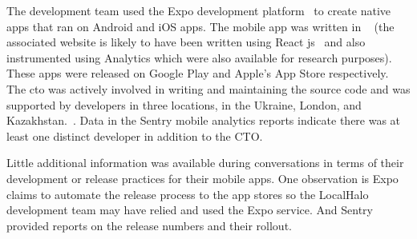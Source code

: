 The development team used the Expo development platform~ to create native apps that ran on Android and iOS apps. The mobile app was written in ~ (the associated website is likely to have been written using React js~ and also instrumented using  Analytics which were also available for research purposes). These apps were released on Google Play and Apple's App Store respectively. The \acrshort{cto} was actively involved in writing and maintaining the source code and was supported by developers in three locations, in the Ukraine, London, and Kazakhstan.~.  Data in the Sentry mobile analytics reports indicate there was at least one distinct developer in addition to the CTO.

Little additional information was available during conversations in terms of their development or release practices for their mobile apps. One observation is Expo claims to automate the release process to the app stores so the LocalHalo development team may have relied and used the Expo service. And Sentry provided reports on the release numbers and their rollout.

